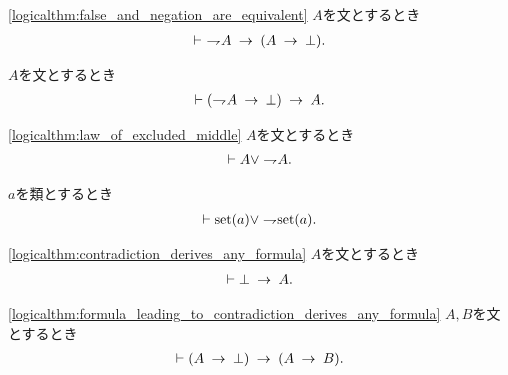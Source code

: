 	\begin{screen}
		\begin{logicalthm}[偽な式は矛盾を導く]
		\ref{logicalthm:false_and_negation_are_equivalent}
			$A$を文とするとき
			\begin{align}
				\vdash\ \rightharpoondown\hspace{-0.25em} A \hspace{0.25em}\rightarrow\hspace{0.25em} (A \hspace{0.25em}\rightarrow\hspace{0.25em} \bot).
			\end{align}
		\end{logicalthm}
	\end{screen}
	
	\begin{screen}
		\begin{logicalthm}[背理法の原理]
			$A$を文とするとき
			\begin{align}
				\vdash (\rightharpoondown\hspace{-0.25em} A \hspace{0.25em}\rightarrow\hspace{0.25em} \bot) \hspace{0.25em}\rightarrow\hspace{0.25em} A.
			\end{align}
		\end{logicalthm}
	\end{screen}
	
	\begin{screen}
		\begin{logicalthm}[排中律]\ref{logicalthm:law_of_excluded_middle}
			$A$を文とするとき
			\begin{align}
				\vdash A \vee \rightharpoondown\hspace{-0.25em} A.
			\end{align}
		\end{logicalthm}
	\end{screen}
	
	\begin{screen}
		\begin{thm}[類は集合であるか真類であるかのいずれかに定まる]
			$a$を類とするとき
			\begin{align}
				\vdash \operatorname*{set} (a) \vee \rightharpoondown\hspace{-0.25em} \operatorname*{set} (a).
			\end{align}
		\end{thm}
	\end{screen}
	
	\begin{screen}
		\begin{logicalthm}
		\ref{logicalthm:contradiction_derives_any_formula}
			$A$を文とするとき
			\begin{align}
				\vdash \bot \hspace{0.25em}\rightarrow\hspace{0.25em} A.
			\end{align}
		\end{logicalthm}
	\end{screen}
	
	\begin{screen}
		\begin{logicalthm}[矛盾を導く式はあらゆる式を導く]
		\ref{logicalthm:formula_leading_to_contradiction_derives_any_formula}
			$A,B$を文とするとき
			\begin{align}
				\vdash (A \hspace{0.25em}\rightarrow\hspace{0.25em} \bot) \hspace{0.25em}\rightarrow\hspace{0.25em} (A \hspace{0.25em}\rightarrow\hspace{0.25em} B).
			\end{align}
		\end{logicalthm}
	\end{screen}
	
